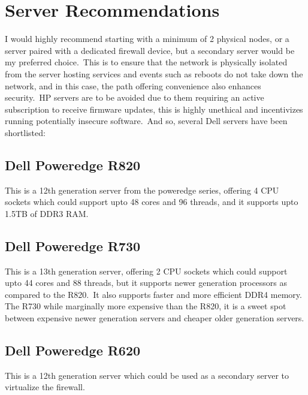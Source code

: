 \section{Server Recommendations}\label{sec:server-recommendations}
I would highly recommend starting with a minimum of 2 physical nodes, or a server paired with a dedicated firewall
device, but a secondary server would be my preferred choice.\ This is to ensure that the network is physically
isolated from the server hosting services and events such as reboots do not take down the network, and in this case,
the path offering convenience also enhances security.\ HP servers are to be avoided due to them requiring an active
subscription to receive firmware updates, this is highly unethical and incentivizes running potentially insecure
software.\ And so, several Dell servers have been shortlisted:


\subsection{Dell Poweredge R820}\label{subsec:dell-poweredge-r820}
This is a 12th generation server from the poweredge series, offering 4 CPU sockets which could support upto 48 cores
and 96 threads, and it supports upto 1.5TB of DDR3 RAM\@.


\subsection{Dell Poweredge R730}\label{subsec:dell-poweredge-r730}
This is a 13th generation server, offering 2 CPU sockets which could support upto 44 cores and 88 threads, but it
supports newer generation processors as compared to the R820.\ It also supports faster and more efficient DDR4 memory.
The R730 while marginally more expensive than the R820, it is a sweet spot between expensive newer generation servers
and cheaper older generation servers.


\subsection{Dell Poweredge R620}\label{subsec:dell-poweredge-r710}
This is a 12th generation server which could be used as a secondary server to virtualize the firewall.


